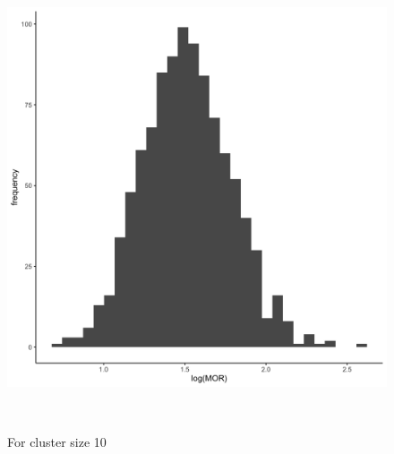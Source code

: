 \documentclass[
  letterpaper,
  DIV=11,
  numbers=noendperiod,
  titlepage]{scrartcl}
\begin{document}
\begin{figure}
\begin{minipage}[t]{0.50\linewidth}
{{\includegraphics{../../plots/two-lvl-ran-int/low-prev/hist_50_10_two_lvl_low_prev.png}

}

\caption{For cluster size 10}

}

\end{minipage}%
\newline
\begin{minipage}[t]{\linewidth}

{\centering 

~

}

\end{minipage}%
\newline
\begin{minipage}[t]{0.50\linewidth}

{\centering 

\raisebox{-\height}{

}}
\end{minipage}
\end{figure}
\end{document}
